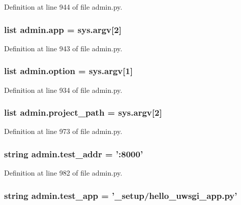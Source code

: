 Definition at line 944 of file admin.\-py.

\hypertarget{namespaceadmin_a88f927a5e67d8ccf759fd256f58a9411}{
\subsubsection[{app}]{\setlength{\rightskip}{0pt plus 5cm}list admin.\-app = sys.\-argv\mbox{[}2\mbox{]}}}\label{namespaceadmin_a88f927a5e67d8ccf759fd256f58a9411}


Definition at line 943 of file admin.\-py.

\hypertarget{namespaceadmin_a5ed72260a120fc91cfd491f424eeb883}{
\subsubsection[{option}]{\setlength{\rightskip}{0pt plus 5cm}list admin.\-option = sys.\-argv\mbox{[}1\mbox{]}}}\label{namespaceadmin_a5ed72260a120fc91cfd491f424eeb883}


Definition at line 934 of file admin.\-py.

\hypertarget{namespaceadmin_a311ce11d8285f485768151b9d757e478}{
\subsubsection[{project\-\_\-path}]{\setlength{\rightskip}{0pt plus 5cm}list admin.\-project\-\_\-path = sys.\-argv\mbox{[}2\mbox{]}}}\label{namespaceadmin_a311ce11d8285f485768151b9d757e478}


Definition at line 973 of file admin.\-py.

\hypertarget{namespaceadmin_a48db396eb86a22a960bba5ce65c12651}{
\subsubsection[{test\-\_\-addr}]{\setlength{\rightskip}{0pt plus 5cm}string admin.\-test\-\_\-addr = '\-:8000'}}\label{namespaceadmin_a48db396eb86a22a960bba5ce65c12651}


Definition at line 982 of file admin.\-py.

\hypertarget{namespaceadmin_ab3c6174394fe2a906dbf095d1d83378a}{
\subsubsection[{test\-\_\-app}]{\setlength{\rightskip}{0pt plus 5cm}string admin.\-test\-\_\-app = '{\bf \-\_\-setup}/hello\-\_\-uwsgi\-\_\-app.\-py'}}\label{namespaceadmin_ab3c6174394fe2a906dbf095d1d83378a}


